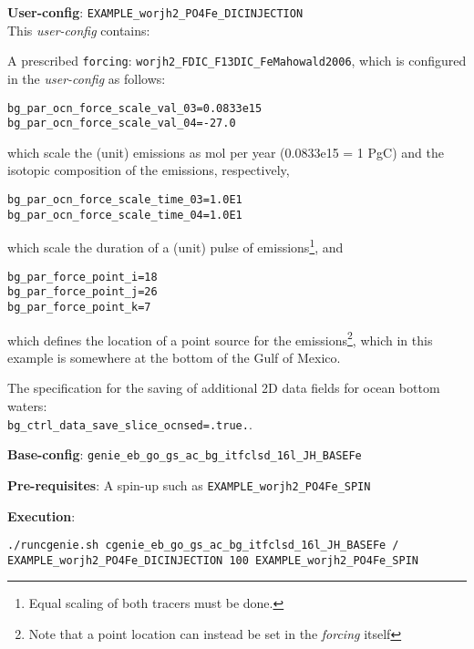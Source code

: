 \documentclass[10pt,twoside]{article}
\begin{document}
\noindent \textbf{User-config}: \texttt{EXAMPLE\_worjh2\_PO4Fe\_DICINJECTION}
\\ This \textit{user-config} contains:
\begin{compactitem}
	\item A prescribed \texttt{forcing}: \texttt{worjh2\_FDIC\_F13DIC\_FeMahowald2006}, which is configured in the \textit{user-config} as follows:
\begin{compactenum}
	\item 
	\begin{verbatim}
bg_par_ocn_force_scale_val_03=0.0833e15
bg_par_ocn_force_scale_val_04=-27.0
		\end{verbatim}
		which scale the (unit) emissions as mol per year (0.0833e15 = 1 PgC) and the isotopic composition of the emissions, respectively,
	\item 
	\begin{verbatim}
bg_par_ocn_force_scale_time_03=1.0E1
bg_par_ocn_force_scale_time_04=1.0E1
		\end{verbatim}
		which scale the duration of a (unit) pulse of emissions\footnote{Equal scaling of both tracers must be done.}, and
	\item 
	\begin{verbatim}
bg_par_force_point_i=18
bg_par_force_point_j=26
bg_par_force_point_k=7
		\end{verbatim}
		which defines the location of a point source for the emissions\footnote{Note that a point location can instead be set in the \textit{forcing} itself}, which in this example is somewhere at the bottom of the Gulf of Mexico.
\end{compactenum}
\item The specification for the saving of additional 2D data fields for ocean bottom waters: 
\\ \texttt{bg\_ctrl\_data\_save\_slice\_ocnsed=.true.}.
\end{compactitem}

\noindent \textbf{Base-config}: \texttt{genie\_eb\_go\_gs\_ac\_bg\_itfclsd\_16l\_JH\_BASEFe}

\noindent \textbf{Pre-requisites}: A spin-up such as \texttt{EXAMPLE\_worjh2\_PO4Fe\_SPIN}

\noindent \textbf{Execution}:
\vspace{-5pt}\begin{verbatim}
./runcgenie.sh cgenie_eb_go_gs_ac_bg_itfclsd_16l_JH_BASEFe / 
EXAMPLE_worjh2_PO4Fe_DICINJECTION 100 EXAMPLE_worjh2_PO4Fe_SPIN
		\end{verbatim}\vspace{-5pt}
\end{document}

